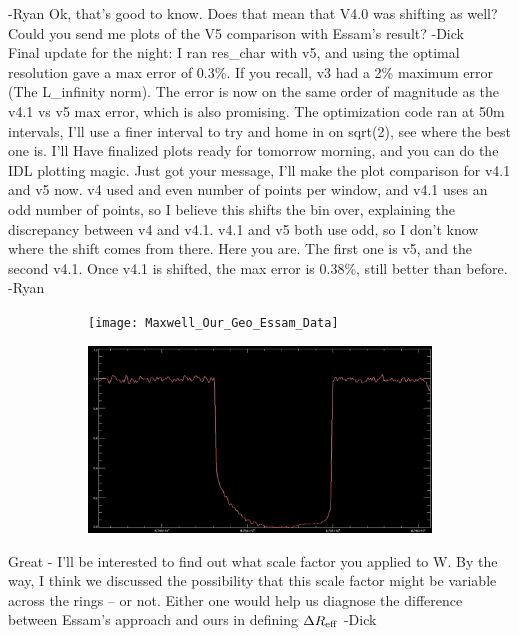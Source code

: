 \documentclass[crop=false,class=book]{standalone}
\begin{document}
-Ryan
Ok, that's good to know. Does that mean that V4.0 was shifting as well? Could you send me plots of the V5 comparison with Essam's result? -Dick\\
Final update for the night: I ran res\_char with v5, and using the optimal resolution gave a max error of 0.3\%. If you recall, v3 had a 2\% maximum error (The L\_infinity norm). The error is now on the same order of magnitude as the v4.1 vs v5 max error, which is also promising. The optimization code ran at 50m intervals, I'll use a finer interval to try and home in on sqrt(2), see where the best one is. I'll Have finalized plots ready for tomorrow morning, and you can do the IDL plotting magic. Just got your message, I'll make the plot comparison for v4.1 and v5 now. v4 used and even number of points per window, and v4.1 uses an odd number of points, so I believe this shifts the bin over, explaining the discrepancy between v4 and v4.1. v4.1 and v5 both use odd, so I don't know where the shift comes from there. Here you are. The first one is v5, and the second v4.1. Once v4.1 is shifted, the max error is 0.38\%, still better than before. -Ryan
\begin{figure}[H]
    \centering
    \begin{subfigure}[b]{0.49\textwidth}
        \texttt{[image: Maxwell\_Our\_Geo\_Essam\_Data]}
    \end{subfigure}
    \begin{subfigure}[b]{0.49\textwidth}
        \includegraphics[width=\textwidth]{images/Maxwell_v4_1.png}
    \end{subfigure}
\end{figure}
Great - I'll be interested to find out what scale factor you applied to W. By the way, I think we discussed the possibility that this scale factor might be variable across the rings -- or not. Either one would help us diagnose the difference between Essam's approach and ours in defining $\Delta R_{\rm eff}$ -Dick
\end{document}
